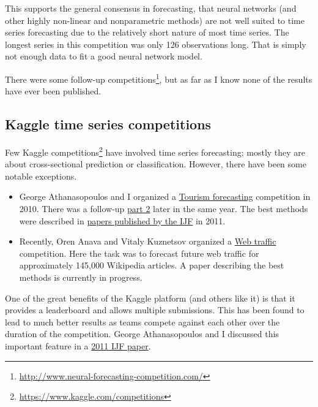 \documentclass[11pt,a4paper,]{article}
\begin{document}
This supports the general consensus in forecasting, that neural networks (and other highly non-linear and nonparametric methods) are not well suited to time series forecasting due to the relatively short nature of most time series. The longest series in this competition was only 126 observations long. That is simply not enough data to fit a good neural network model.

There were some follow-up competitions\footnote{\url{http://www.neural-forecasting-competition.com/}}, but as far as I know none of the results have ever been published.

\hypertarget{kaggle-time-series-competitions}{%
\subsection*{Kaggle time series competitions}\label{kaggle-time-series-competitions}}

Few Kaggle competitions\footnote{\url{https://www.kaggle.com/competitions}} have involved time series forecasting; mostly they are about cross-sectional prediction or classification. However, there have been some notable exceptions.

\begin{itemize}
\item
  George Athanasopoulos and I organized a \href{https://www.kaggle.com/c/tourism1}{Tourism forecasting} competition in 2010. There was a follow-up \href{https://www.kaggle.com/c/tourism2}{part 2} later in the same year. The best methods were described in \href{https://www.sciencedirect.com/journal/international-journal-of-forecasting/vol/27/issue/3}{papers published by the IJF} in 2011.
\item
  Recently, Oren Anava and Vitaly Kuznetsov organized a \href{https://www.kaggle.com/c/web-traffic-time-series-forecasting}{Web traffic} competition. Here the task was to forecast future web traffic for approximately 145,000 Wikipedia articles. A paper describing the best methods is currently in progress.
\end{itemize}

One of the great benefits of the Kaggle platform (and others like it) is that it provides a leaderboard and allows multiple submissions. This has been found to lead to much better results as teams compete against each other over the duration of the competition. George Athanasopoulos and I discussed this important feature in a \href{/publications/kaggle/}{2011 IJF paper}.
\end{document}
